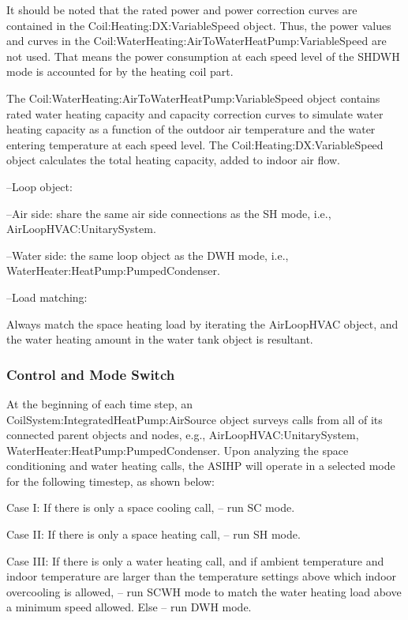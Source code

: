It should be noted that the rated power and power correction curves are contained in the Coil:Heating:DX:VariableSpeed object. Thus, the power values and curves in the Coil:WaterHeating:AirToWaterHeatPump:VariableSpeed are not used. That means the power consumption at each speed level of the SHDWH mode is accounted for by the heating coil part. 

The Coil:WaterHeating:AirToWaterHeatPump:VariableSpeed object contains rated water heating capacity and capacity correction curves to simulate water heating capacity as a function of the outdoor air temperature and the water entering temperature at each speed level. The Coil:Heating:DX:VariableSpeed object calculates the total heating capacity, added to indoor air flow. 

--Loop object: 

--Air side: share the same air side connections as the SH mode, i.e., AirLoopHVAC:UnitarySystem.

--Water side: the same loop object as the DWH mode, i.e., WaterHeater:HeatPump:PumpedCondenser.

--Load matching: 

Always match the space heating load by iterating the AirLoopHVAC object, and the water heating amount in the water tank object is resultant.

\subsubsection{Control and Mode Switch}\label{Control-and-Mode-Switch-ASIHP}

At the beginning of each time step, an CoilSystem:IntegratedHeatPump:AirSource object surveys calls from all of its connected parent objects and nodes, e.g.,  AirLoopHVAC:UnitarySystem, WaterHeater:HeatPump:PumpedCondenser. Upon analyzing the space conditioning and water heating calls, the ASIHP will operate in a selected mode for the following timestep, as shown below:

Case I: 
If there is only a space cooling call, – run SC mode.
 
Case II: 
If there is only a space heating call, – run SH mode.

Case III: 
If there is only a water heating call, and if ambient temperature and indoor temperature are larger than the temperature settings above which indoor overcooling is allowed, – run SCWH mode to match the water heating load above a minimum speed allowed.
Else – run DWH mode.

